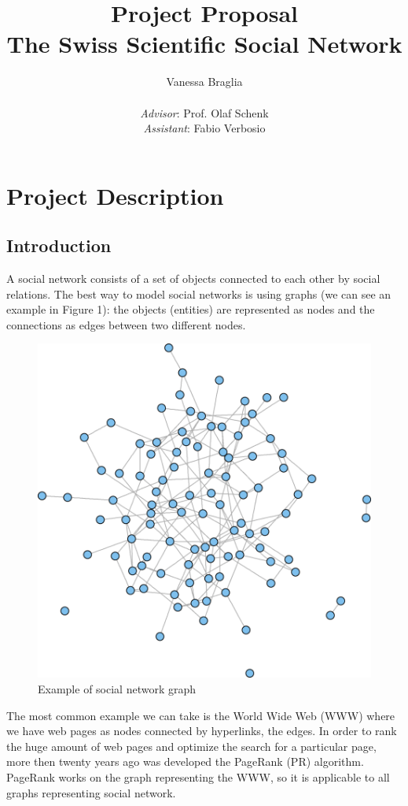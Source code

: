 \documentclass[12 pt]{article}
\author{Vanessa Braglia \\ \\ \textit{Advisor}: Prof. Olaf Schenk \\ \textit{Assistant}: Fabio Verbosio}
\title{\textbf{Project Proposal} \\ The Swiss Scientific Social Network}
\begin{document}
\maketitle 

\section*{Project Description}
\subsection*{Introduction}
A social network consists of a set of objects connected to each other by social relations. The best way to model social networks is using graphs (we can see an example in Figure 1): the objects (entities) are represented as nodes and the connections as edges between two different nodes. \\
\begin{figure} [h!]
\centering 
\includegraphics[scale=0.5]{graph.png}
\caption{Example of social network graph}
\end{figure}
The most common example we can take is the World Wide Web (WWW) where we have web pages as nodes connected by hyperlinks, the edges. In order to rank the huge amount of web pages and optimize the search for a particular page, more then twenty years ago was developed the PageRank (PR) algorithm. PageRank works on the graph representing the WWW, so it is applicable to all graphs representing social network.
\end{document}
